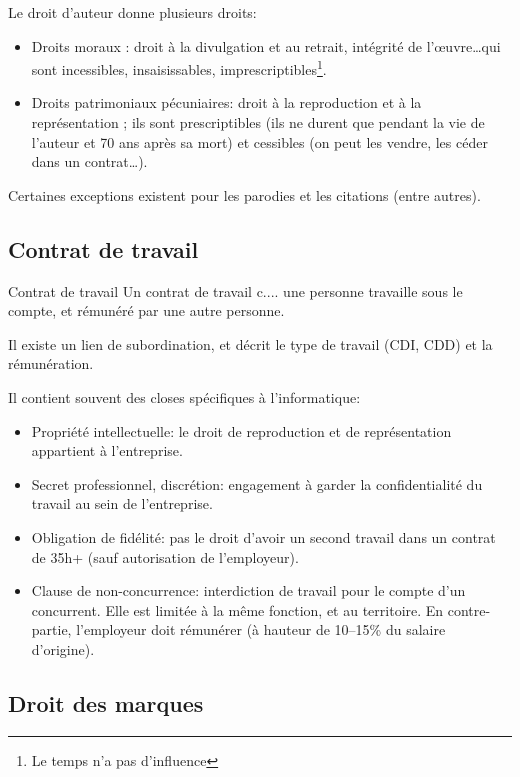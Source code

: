 \documentclass[10pt,a4paper,french]{article}
\begin{document}
Le droit d'auteur donne plusieurs droits:
\begin{itemize}
\item Droits moraux : droit à la divulgation et au retrait, intégrité de l'œuvre\ldots qui sont incessibles, insaisissables, imprescriptibles\footnote{Le temps n'a pas d'influence}.
\item Droits patrimoniaux pécuniaires: droit à la reproduction et à la représentation ; ils sont prescriptibles (ils ne durent que pendant la vie de l'auteur et 70 ans après sa mort) et cessibles (on peut les vendre, les céder dans un contrat\ldots).
\end{itemize}

Certaines exceptions existent pour les parodies et les citations (entre autres).

\subsection{Contrat de travail}
\begin{cquote}{Contrat de travail}
Un contrat de travail c.... une personne travaille sous le compte, et rémunéré par une autre personne.
\end{cquote}

Il existe un lien de subordination, et décrit le type de travail (CDI, CDD) et la rémunération.

Il contient souvent des closes spécifiques à l'informatique:
\begin{itemize}
\item Propriété intellectuelle: le droit de reproduction et de représentation appartient à l'entreprise.
\item Secret professionnel, discrétion: engagement à garder la confidentialité du travail au sein de l'entreprise.
\item Obligation de fidélité: pas le droit d'avoir un second travail dans un contrat de 35h+ (sauf autorisation de l'employeur).
\item Clause de non-concurrence: interdiction de travail pour le compte d'un concurrent. Elle est limitée à la même fonction, et au territoire. En contre-partie, l'employeur doit rémunérer (à hauteur de 10--15\% du salaire d'origine).
\end{itemize}

\subsection{Droit des marques}
\end{document}
